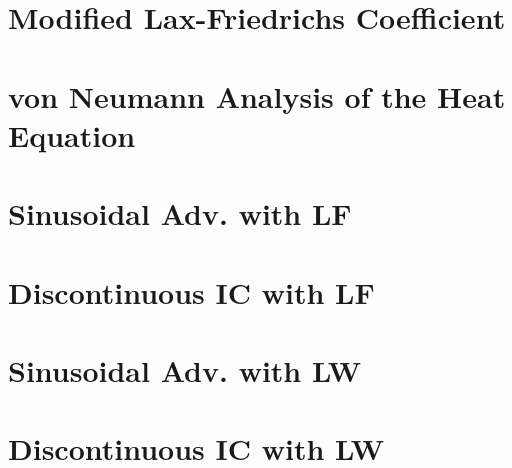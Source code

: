 \documentclass{article}
\begin{document}
\section{Modified Lax-Friedrichs Coefficient}

\section{von Neumann Analysis of the Heat Equation}

\section{Sinusoidal Adv. with LF}

\section{Discontinuous IC with LF}

\section{Sinusoidal Adv. with LW}

\section{Discontinuous IC with LW}
\end{document}
